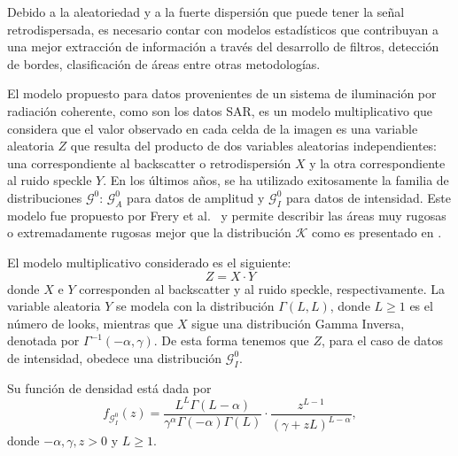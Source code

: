 \documentclass[11pt]{article}
\begin{document}
Debido a la aleatoriedad y a la fuerte dispersión que puede tener la señal retrodispersada, es necesario contar con modelos estadísticos que contribuyan a una mejor extracción de información a través del desarrollo de filtros, detección de bordes, clasificación de áreas entre otras metodologías. 


El modelo propuesto para datos provenientes de un sistema de iluminación por radiación coherente, como son los datos SAR, es un modelo multiplicativo que considera que el valor observado en cada celda de la imagen es una variable aleatoria $Z$ que resulta del producto de dos variables aleatorias independientes: una correspondiente al backscatter o retrodispersión $X$ y la otra correspondiente al ruido speckle $Y$. En los últimos años, se ha utilizado exitosamente la familia de distribuciones $\mathcal{G}^0$: $\mathcal{G}_A^0$ para datos de amplitud y $\mathcal G_I^0$ para datos de intensidad. Este modelo fue propuesto por Frery et al.~\cite{Frery97} y permite describir las áreas muy rugosas o extremadamente rugosas mejor que la distribución $\mathcal{K}$ como es presentado en \cite{Jakeman87}.

El modelo multiplicativo considerado es el siguiente:
\begin{equation*}
Z=X \cdot Y  
\end{equation*}
donde $X$ e $Y$ corresponden al backscatter y al ruido speckle, respectivamente. La variable aleatoria $Y$ se modela con la distribución $\Gamma ( L,L) $, donde $L\geq 1$ es el número de looks, mientras que $X$ sigue una distribución Gamma Inversa, denotada por  $\Gamma^{-1}(-\alpha ,\gamma) $. De esta forma tenemos que $Z$, para el caso de datos de intensidad, obedece una distribución $\mathcal G_I^0$.

Su función de densidad está dada por
\begin{equation*}
f_{\mathcal{G}_I^{0}}( z) =\frac{L^{L}\Gamma ( L-\alpha
	) }{\gamma ^{\alpha }\Gamma ( -\alpha ) \Gamma (
	L) }\cdot  
\frac{z^{L-1}}{( \gamma +zL) ^{L-\alpha }},%
\label{ec_dens_gI0}
\end{equation*}
donde $-\alpha,\gamma ,z>0$ y $L\geq 1$.
\end{document}
